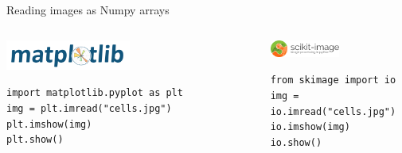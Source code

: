 \documentclass[9pt, aspectratio=169]{beamer}
\begin{document}
\begin{frame}
    {Reading images as Numpy arrays}
    \begin{columns}
        \begin{column}{0.5\textwidth}
            \begin{center}
                \includegraphics[width=0.5\textwidth]{matplotlib_logo.png}
            \end{center}
            \begin{codebox}
                \texttt{import matplotlib.pyplot as plt\\
                    \texttt{img = plt.imread(}"cells.jpg")\\
                    plt.imshow(\texttt{img)\\
                        plt.show(})
                }
            \end{codebox}
        \end{column}
        \begin{column}{0.5\textwidth}
            \begin{center}
                \includegraphics[width=0.5\textwidth]{skimage_logo.png}
            \end{center}
            \begin{codebox}
                \texttt{from skimage import io\\
                    \texttt{img = io.imread(}"cells.jpg")\\
                    io.imshow(\texttt{img)\\
                        io.show(})
                }
            \end{codebox}
        \end{column}
    \end{columns}
\end{frame}
\end{document}
